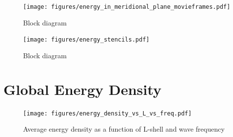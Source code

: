 
\begin{figure}
\begin{center}
\texttt{[image: figures/energy\_in\_meridional\_plane\_movieframes.pdf]}
\caption{Block diagram}
\label{fig:energy_from_single_flash}
\end{center}
\end{figure}


\begin{figure}[ht]
\begin{center}
\texttt{[image: figures/energy\_stencils.pdf]}
\caption{Block diagram}
\label{fig:energy_stencils}
\end{center}
\end{figure}

\section{Global Energy Density}

\begin{figure}
\begin{center}
\texttt{[image: figures/energy\_density\_vs\_L\_vs\_freq.pdf]}
\caption[Average energy density vs L and frequency]{Average energy density as a function of L-shell and wave frequency}
\label{fig:energy_density_vs_L_vs_freq}
\end{center}
\end{figure}
